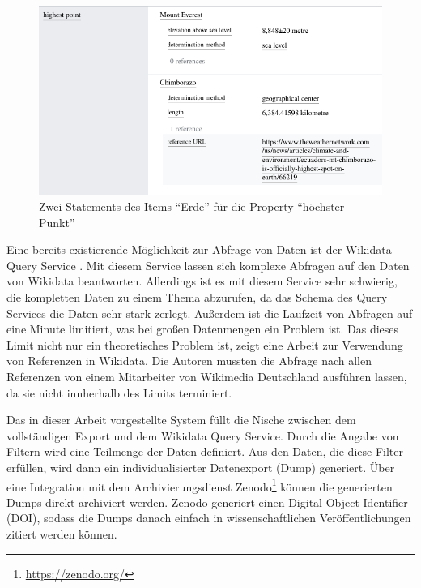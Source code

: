 \begin{figure}
  \includegraphics[width=\linewidth]{pics/example-statement}
  \caption{Zwei Statements des Items "`Erde"' für die Property "`höchster Punkt"'}
  \label{fig:sample-statement}
\end{figure} 

Eine bereits existierende Möglichkeit zur Abfrage von Daten ist der Wikidata Query Service \cite{wd-sparql}. 
Mit diesem Service lassen sich komplexe Abfragen auf den Daten von Wikidata beantworten.
Allerdings ist es mit diesem Service sehr schwierig, die kompletten Daten zu einem Thema abzurufen, da das Schema des Query Services die Daten sehr stark zerlegt.
Außerdem ist die Laufzeit von Abfragen auf eine Minute limitiert, was bei großen Datenmengen ein Problem ist.
Das dieses Limit nicht nur ein theoretisches Problem ist, zeigt eine Arbeit zur Verwendung von Referenzen in Wikidata\cite{wd-wk-common-references}.
Die Autoren mussten die Abfrage nach allen Referenzen von einem Mitarbeiter von Wikimedia Deutschland ausführen lassen, da sie nicht innherhalb des Limits terminiert.

Das in dieser Arbeit vorgestellte System füllt die Nische zwischen dem vollständigen Export und dem Wikidata Query Service.
Durch die Angabe von Filtern wird eine Teilmenge der Daten definiert.
Aus den Daten, die diese Filter erfüllen, wird dann ein individualisierter Datenexport (Dump) generiert.
Über eine Integration mit dem Archivierungsdienst Zenodo\footnote{\url{https://zenodo.org/}} können die generierten Dumps direkt archiviert werden.
Zenodo generiert einen Digital Object Identifier (DOI), sodass die Dumps danach einfach in wissenschaftlichen Veröffentlichungen zitiert werden können.

